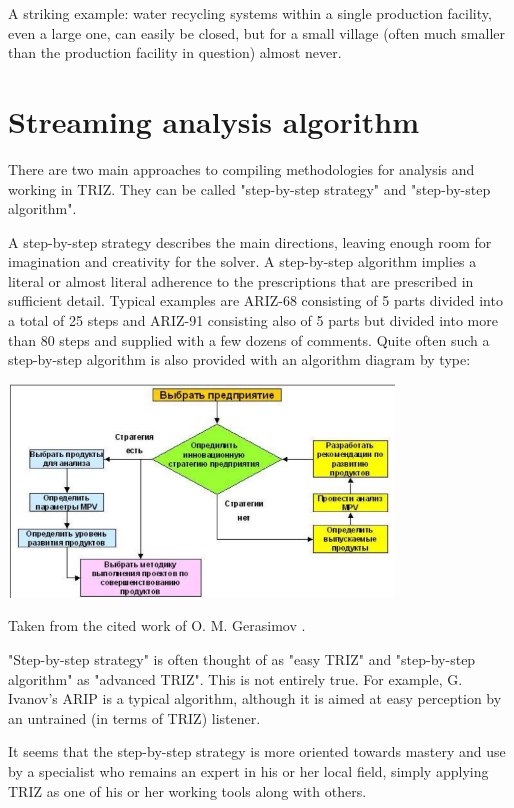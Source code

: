 \documentclass[a4paper,11pt]{article}
\begin{document}
A striking example: water recycling systems within a single production
facility, even a large one, can easily be closed, but for a small village
(often much smaller than the production facility in question) almost never.

\section{Streaming analysis algorithm}

There are two main approaches to compiling methodologies for analysis and
working in TRIZ.  They can be called "step-by-step strategy" and "step-by-step
algorithm".

A step-by-step strategy describes the main directions, leaving enough room for
imagination and creativity for the solver. A step-by-step algorithm implies a
literal or almost literal adherence to the prescriptions that are prescribed
in sufficient detail. Typical examples are ARIZ-68 \cite{B21} consisting of 5
parts divided into a total of 25 steps and ARIZ-91 \cite{B14} consisting also
of 5 parts but divided into more than 80 steps and supplied with a few dozens
of comments. Quite often such a step-by-step algorithm is also provided with
an algorithm diagram by type:
\begin{center}
  \includegraphics[width=.8\textwidth]{6.png}
\end{center}
Taken from the cited work of O. M. Gerasimov \cite{B9}.

"Step-by-step strategy" is often thought of as "easy TRIZ" and "step-by-step
algorithm" as "advanced TRIZ". This is not entirely true. For example,
G. Ivanov's ARIP \cite{B22} is a typical algorithm, although it is aimed at
easy perception by an untrained (in terms of TRIZ) listener.

It seems that the step-by-step strategy is more oriented towards mastery and
use by a specialist who remains an expert in his or her local field, simply
applying TRIZ as one of his or her working tools along with others.
\end{document}
